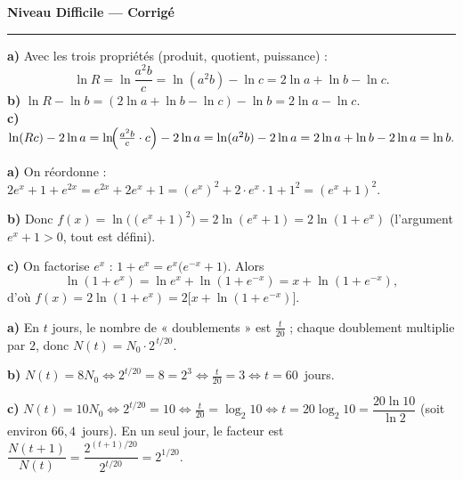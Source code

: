 \documentclass[11pt,a4paper]{article}
\begin{document}
\begin{center}
{\LARGE\bfseries\color{primarydark} Niveau Difficile — Corrigé}\\[2pt]
{\color{primary}\rule{0.45\textwidth}{1.2pt}}
\end{center}
\vspace{1mm}

\begin{corrige}
\textbf{a)} Avec les trois propriétés (produit, quotient, puissance) :
\[ \ln R=\ln\frac{a^{2}b}{c}=\ln(a^{2}b)-\ln c=2\ln a+\ln b-\ln c. \]
\textbf{b)} $\ln R-\ln b=(2\ln a+\ln b-\ln c)-\ln b=2\ln a-\ln c.$ \\
\textbf{c)} $\ln(Rc)-2\ln a=\ln\!\Bigl(\tfrac{a^{2}b}{c}\cdot c\Bigr)-2\ln a=\ln(a^{2}b)-2\ln a
=2\ln a+\ln b-2\ln a=\ln b.$
\end{corrige}

\begin{corrige}
\textbf{a)} On réordonne : $2e^{x}+1+e^{2x}=e^{2x}+2e^{x}+1=(e^{x})^{2}+2\cdot e^{x}\cdot 1+1^{2}=(e^{x}+1)^{2}$.

\smallskip
\textbf{b)} Donc $f(x)=\ln\bigl((e^{x}+1)^{2}\bigr)=2\ln(e^{x}+1)=2\ln(1+e^{x})$
(l'argument $e^{x}+1>0$, tout est défini).

\smallskip
\textbf{c)} On factorise $e^{x}$ : $1+e^{x}=e^{x}\bigl(e^{-x}+1\bigr)$. Alors
\[ \ln(1+e^{x})=\ln e^{x}+\ln(1+e^{-x})=x+\ln(1+e^{-x}), \]
d'où $f(x)=2\ln(1+e^{x})=2\bigl[x+\ln(1+e^{-x})\bigr]$.
\end{corrige}

\begin{corrige}
\textbf{a)} En $t$ jours, le nombre de « doublements » est $\tfrac{t}{20}$ ; chaque doublement multiplie
par $2$, donc $N(t)=N_0\cdot 2^{\,t/20}$.

\smallskip
\textbf{b)} $N(t)=8N_0\Leftrightarrow 2^{t/20}=8=2^{3}\Leftrightarrow \tfrac{t}{20}=3\Leftrightarrow t=60$~jours.

\smallskip
\textbf{c)} $N(t)=10N_0\Leftrightarrow 2^{t/20}=10\Leftrightarrow \tfrac{t}{20}=\log_2 10
\Leftrightarrow t=20\log_2 10=\dfrac{20\ln 10}{\ln 2}$ (soit environ $66{,}4$~jours).
En un seul jour, le facteur est $\dfrac{N(t+1)}{N(t)}=\dfrac{2^{(t+1)/20}}{2^{t/20}}=2^{1/20}$.
\end{corrige}
\end{document}
